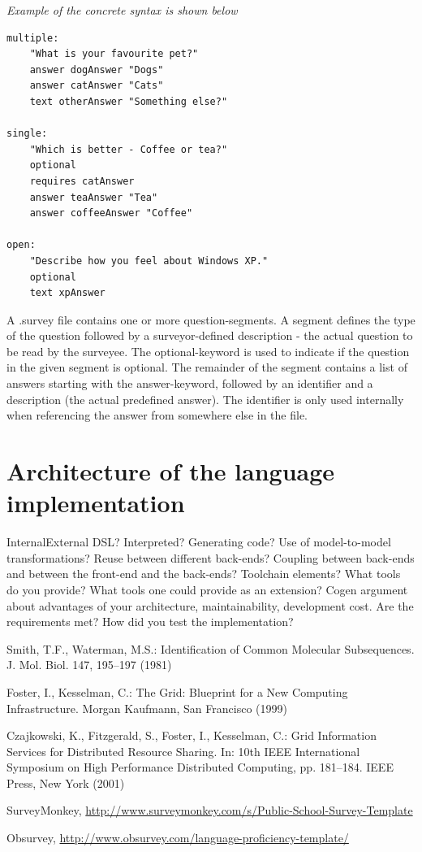 \documentclass[runningheads]{llncs}
\begin{document}
\noindent
{\it Example of the concrete syntax is shown below}
\begin{verbatim}
multiple:
	"What is your favourite pet?"
	answer dogAnswer "Dogs"
	answer catAnswer "Cats"
	text otherAnswer "Something else?"

single:
	"Which is better - Coffee or tea?"
	optional
	requires catAnswer
	answer teaAnswer "Tea"
	answer coffeeAnswer "Coffee" 

open:
	"Describe how you feel about Windows XP."
	optional
	text xpAnswer
\end{verbatim}
%
\noindent
A .survey file contains one or more question-segments. A segment defines the type of the question followed by a surveyor-defined description - the actual question to be read by the surveyee. The optional-keyword is used to indicate if the question in the given segment is optional. The remainder of the segment contains a list of answers starting with the answer-keyword, followed by an identifier and a description (the actual predefined answer). The identifier is only used internally when referencing the answer from somewhere else in the file.

\section{Architecture of the language implementation}
Internal\/External DSL? Interpreted? Generating code? Use of
model-to-model transformations?
Reuse between different back-ends? Coupling between back-ends and
between the front-end and the back-ends?
Toolchain elements? What tools do you provide? What tools one could
provide as an extension?
Cogen argument about advantages of your architecture, maintainability,
development cost.
Are the requirements met?
How did you test the implementation?

\begin{thebibliography}{4}

 Smith, T.F., Waterman, M.S.: Identification of Common Molecular
Subsequences. J. Mol. Biol. 147, 195--197 (1981)

 Foster, I., Kesselman, C.: The Grid: Blueprint for a New Computing
Infrastructure. Morgan Kaufmann, San Francisco (1999)

 Czajkowski, K., Fitzgerald, S., Foster, I., Kesselman, C.: Grid
Information Services for Distributed Resource Sharing. In: 10th IEEE
International Symposium on High Performance Distributed Computing, pp.
181--184. IEEE Press, New York (2001)

SurveyMonkey, \url{http://www.surveymonkey.com/s/Public-School-Survey-Template}

Obsurvey, \url{http://www.obsurvey.com/language-proficiency-template/}

\end{thebibliography}
\end{document}
